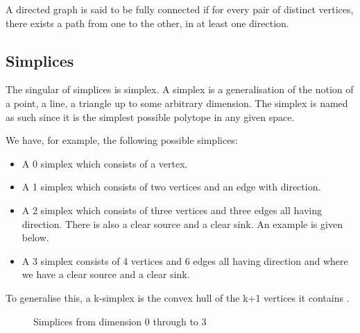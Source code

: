 A directed graph is said to be fully connected if for every pair of distinct vertices, there exists a path from one to the other, in at least one direction.
\subsection{Simplices}
The singular of simplices is simplex. A simplex is a generalisation of the notion of a point, a line, a triangle up to some arbitrary dimension. The simplex is named as such since it is the simplest possible polytope in any given space.

We have, for example, the following possible simplices:

\begin{itemize}
    \item A 0 simplex which consists of a vertex.
    \item A 1 simplex which consists of two vertices and an edge with direction.
    \item A 2 simplex which consists of three vertices and three edges all having direction. There is also a clear source and a clear sink. An example is given below.
    \item A 3 simplex consists of 4 vertices and 6 edges all having direction and where we have a clear source and a clear sink.
\end{itemize}
To generalise this, a k-simplex is the convex hull of the k+1 vertices it contains \cite{2018}. 
\begin{figure}[H]%
    \centering
    \captionsetup{justification=centering}
    \qquad
    \qquad
    \qquad
    \caption{Simplices from dimension 0 through to 3}%
    \label{fig:example}%
\end{figure}

